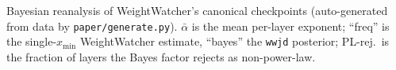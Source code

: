
\begin{table}[t]
\centering\small
\caption{Bayesian reanalysis of WeightWatcher's canonical checkpoints (auto-generated from
data by \texttt{paper/generate.py}). $\bar\alpha$ is the mean per-layer exponent; ``freq''
is the single-$x_{\min}$ WeightWatcher estimate, ``bayes'' the \texttt{wwjd} posterior;
PL-rej.\ is the fraction of layers the Bayes factor rejects as non-power-law.}
\label{tab:ww_summary}
\wwSummaryTable
\end{table}
